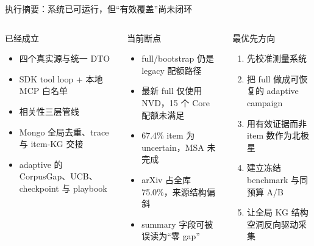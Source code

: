 \begin{frame}{执行摘要：系统已可运行，但“有效覆盖”尚未闭环}
\begin{columns}[T,onlytextwidth]
\begin{exampleblock}{已经成立}
\begin{itemize}
  \item 四个真实源与统一 DTO
  \item SDK tool loop + 本地 MCP 白名单
  \item 相关性三层管线
  \item Mongo 全局去重、trace 与 item-KG 交接
  \item adaptive 的 CorpusGap、UCB、checkpoint 与 playbook
\end{itemize}
\end{exampleblock}
\begin{alertblock}{当前断点}
\begin{itemize}
  \item full/bootstrap 仍是 legacy 配额路径
  \item 最新 full 仅使用 NVD，15 个 Core 配额未满足
  \item 67.4\% item 为 uncertain，MSA 未完成
  \item arXiv 占全库 75.0\%，来源结构偏斜
  \item summary 字段可被误读为“零 gap”
\end{itemize}
\end{alertblock}
\begin{block}{最优先方向}
\begin{enumerate}
  \item 先校准测量系统
  \item 把 full 做成可恢复的 adaptive campaign
  \item 用有效证据而非 item 数作为北极星
  \item 建立冻结 benchmark 与同预算 A/B
  \item 让全局 KG 结构空洞反向驱动采集
\end{enumerate}
\end{block}
\end{columns}
\end{frame}

